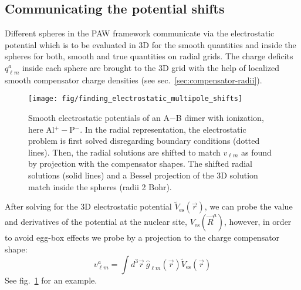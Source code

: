 \documentclass[oribibl]{llncs}
\newcommand{\um}[1]{_{\mathrm{#1}}}
\begin{document}
\subsection{Communicating the potential shifts}\label{sec:multipole-shifts}
Different spheres in the PAW framework communicate via the electrostatic
potential which is to be evaluated in 3D for the smooth quantities
and inside the spheres for both, smooth and true quantities on radial grids.
The charge deficits $q^a_{\ell m}$ inside each sphere are
brought to the 3D grid with the help of localized smooth compensator charge densities 
(see sec.~\ref{sec:compensator-radii}).
%
\begin{figure}
  \begin{minipage}[c]{.990\textwidth}
	\texttt{[image: fig/finding\_electrostatic\_multipole\_shifts]} %
  \end{minipage}\hfill
  \begin{minipage}[c]{.009\textwidth}
  \end{minipage}
  \label{fig:multipole-shifts}
  \caption{Smooth electrostatic potentials of an A$-$B dimer with ionization, here Al$^+ -$P$^-$.
  In the radial representation, the electrostatic problem is first solved disregarding boundary conditions (dotted lines).
  Then, the radial solutions are shifted to match $v_{\ell m}$ as found by projection with the compensator shapes.
  The shifted radial solutions (solid lines) and a Bessel projection of the 3D solution match inside the spheres (radii 2 Bohr).}
\end{figure}
%
%
After solving for the 3D electrostatic potential $\tilde V\um{es}(\vec r)$,
we can probe the value and derivatives of the potential at the nuclear site, $V\um{es}(\vec R^a)$,
however, in order to avoid egg-box effects we
probe by a projection to the charge compensator shape:
$$ v^a_{\ell m} = \int d^3 \vec r \  \hat g_{\ell m}(\vec r) \tilde V\um{es}(\vec r) $$
See fig.~\ref{fig:multipole-shifts} for an example.
\end{document}
